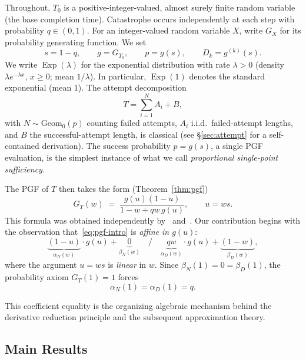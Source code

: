 \documentclass[11pt]{article}
\theoremstyle{plain}
\theoremstyle{definition}
\theoremstyle{remark}
\DeclareMathOperator{\Exp}{Exp}
\begin{document}
Throughout, $T_0$ is a positive-integer-valued, almost surely finite random variable (the base completion time). Catastrophe occurs independently at each step with probability $q \in (0,1)$.  
For an integer-valued random variable $X$, write $G_X$ for its probability generating function.  
We set
\[
  s = 1-q, \qquad g = G_{T_0}, \qquad p = g(s), \qquad D_k = g^{(k)}(s).
\]
We write $\Exp(\lambda)$ for the exponential distribution with rate $\lambda > 0$ (density $\lambda e^{-\lambda x}$, $x \geq 0$; mean $1/\lambda$).  In particular, $\Exp(1)$ denotes the standard exponential (mean $1$). The attempt decomposition
\begin{equation}\label{eq:attempt}
  T = \sum_{i=1}^{N} A_i + B,
\end{equation}
with $N \sim \mathrm{Geom}_0(p)$ counting failed attempts, $A_i$ i.i.d.\ failed-attempt lengths, and $B$ the successful-attempt length, is classical (see \S\ref{sec:attempt} for a self-contained derivation).  
The success probability $p = g(s)$, a single PGF evaluation, is the simplest instance of what we call \emph{proportional single-point sufficiency}.

The PGF of $T$ then takes the form (Theorem~\ref{thm:pgf})
\begin{equation}\label{eq:pgf-intro}
  G_T(w) \;=\; \frac{g(u)(1-u)}{1 - w + qw\,g(u)}, \qquad u = ws.
\end{equation}
This formula was obtained independently by~\cite{FP21} and~\cite{BP21}.  Our contribution begins with the observation that~\eqref{eq:pgf-intro} is \emph{affine in $g(u)$}:
\begin{equation}\label{eq:affine-intro}
  \underbrace{(1-u)}_{\alpha_N(w)} \cdot g(u) + \underbrace{0}_{\beta_N(w)}
  \quad\Big/\quad
  \underbrace{qw}_{\alpha_D(w)} \cdot g(u) + \underbrace{(1-w)}_{\beta_D(w)},
\end{equation}
where the argument $u = ws$ is \emph{linear} in $w$.  Since $\beta_N(1) = 0 = \beta_D(1)$, the probability axiom $G_T(1)=1$ forces
\begin{equation}\label{eq:coeff-match-intro}
  \alpha_N(1) = \alpha_D(1) = q.
\end{equation}


This coefficient equality is the organizing algebraic mechanism behind the derivative reduction principle and the subsequent approximation theory.




\subsection{Main Results}
\end{document}
